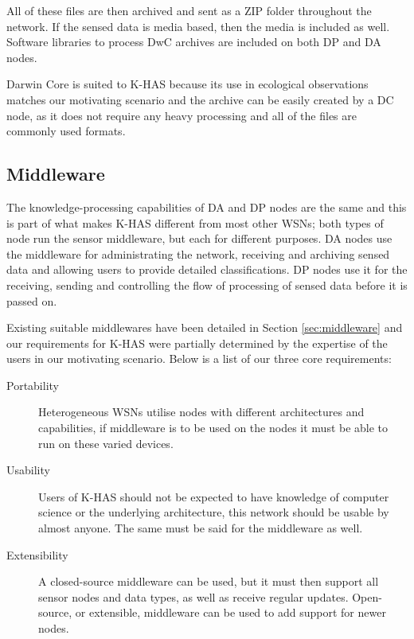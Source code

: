 % 


All of these files are then archived and sent as a ZIP folder throughout the network. If the sensed data is media based, then the media is included as well. Software libraries to process DwC archives are included on both DP and DA nodes.

Darwin Core is suited to K-HAS because its use in ecological observations matches our motivating scenario and the archive can be easily created by a DC node, as it does not require any heavy processing and all of the files are commonly used formats.
	
	\subsection{Middleware}
	The knowledge-processing capabilities of DA and DP nodes are the same and this is part of what makes K-HAS different from most other WSNs; both types of node run the sensor middleware, but each for different purposes. DA nodes use the middleware for administrating the network, receiving and archiving sensed data and allowing users to provide detailed classifications. DP nodes use it for the receiving, sending and controlling the flow of processing of sensed data before it is passed on.
	
	Existing suitable middlewares have been detailed in Section \ref{sec:middleware} and our requirements for K-HAS were partially determined by the expertise of the users in our motivating scenario. Below is a list of our three core requirements:
	\begin{description}
		\item[Portability] Heterogeneous WSNs utilise nodes with different architectures and capabilities, if middleware is to be used on the nodes it must be able to run on these varied devices. 
		\item[Usability] Users of K-HAS should not be expected to have knowledge of computer science or the underlying architecture, this network should be usable by almost anyone. The same must be said for the middleware as well.
		\item[Extensibility] A closed-source middleware can be used, but it must then support all sensor nodes and data types, as well as receive regular updates. Open-source, or extensible, middleware can be used to add support for newer nodes.
	\end{description}
	
